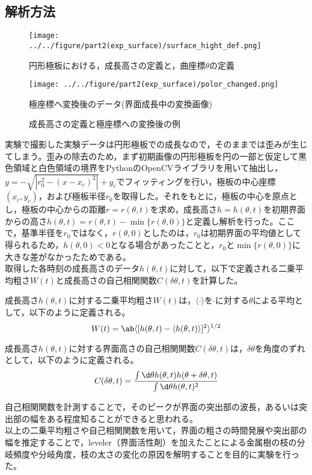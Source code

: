 \documentclass[autodetect-engine,dvi=dvipdfmx,a4paper,ja=standard,oneside,openany,11pt,draft]{bxjsbook}
\begin{document}
\subsection{解析方法}
\begin{figure}[H]
  \begin{minipage}
    {0.64\textwidth}
    \centering
    \texttt{[image: ../../figure/part2(exp\_surface)/surface\_hight\_def.png]}
    \caption{円形極板における，成長高さの定義と，曲座標$\theta$の定義}
    \label{fig:surface_hight_def}
  \end{minipage}
  \begin{minipage}
    {0.32\textwidth}
    \centering
    \texttt{[image: ../../figure/part2(exp\_surface)/polor\_changed.png]}
    \caption{極座標へ変換後のデータ(界面成長中の変換画像)}
    \label{fig:polor_changed}
  \end{minipage}
  \caption{成長高さの定義と極座標への変換後の例}
  \label{fig:surface_hight_def_polor_changed}
\end{figure}
実験で撮影した実験データは円形極板での成長なので，そのままでは歪みが生じてしまう。歪みの除去のため，まず初期画像の円形極板を円の一部と仮定して黒色領域と白色領域の境界をPythonのOpenCVライブラリを用いて抽出し，$y=-\sqrt{|r_0^2-(x-x_c)^2|}+y_c$でフィッティングを行い，極板の中心座標$(x_c,y_c)$，および極板半径$r_0$を取得した。それをもとに，極板の中心を原点とし，極板の中心からの距離$r=r(\theta,t)$を求め，成長高さ$h=h(\theta,t)$を初期界面からの高さ$h(\theta,t)=r(\theta,t)-\min{\{r(\theta,0)\}}$と定義し解析を行った。ここで，基準半径を$r_0$ではなく，$r(\theta,0)$としたのは，$r_0$は初期界面の平均値として得られるため，$h(\theta,0)<0$となる場合があったことと，$r_0$と$\min{\{r(\theta,0)\}}$に大きな差がなかったためである。\\
取得した各時刻の成長高さのデータ$h(\theta,t)$に対して，以下で定義される二乗平均粗さ$W(t)$と成長高さの自己相関関数$C(\delta\theta,t)$を計算した。
\begin{defi}
  成長高さ$h(\theta,t)$に対する二乗平均粗さ$W(t)$は，$\langle\cdot\rangle$を$\cdot$に対する$\theta$による平均として，以下のように定義される。
  \begin{equation}
    W(t) = \ab\langle[h(\theta,t)-\langle h(\theta,t)\rangle]^2\rangle^{1/2}
  \end{equation}
  \label{def:W}
\end{defi}
\begin{defi}
  成長高さ$h(\theta,t)$に対する界面高さの自己相関関数$C(\delta\theta,t)$は，$\delta \theta$を角度のずれとして，以下のように定義される。
  \begin{equation}
    C(\delta\theta,t) = \frac{\int \d \theta h(\theta,t)h(\theta+\delta\theta,t)}{\int \d \theta h(\theta,t)^2}
  \end{equation}
  \label{def:C}
\end{defi}
自己相関関数を計測することで，そのピークが界面の突出部の波長，あるいは突出部の幅をある程度知ることができると思われる。\\
以上の二乗平均粗さや自己相関関数を用いて，界面の粗さの時間発展や突出部の幅を推定することで，leveler（界面活性剤）を加えたことによる金属樹の枝の分岐頻度や分岐角度，枝の太さの変化の原因を解明することを目的に実験を行った。
\ifdraft{
  
  
}{}
\end{document}
